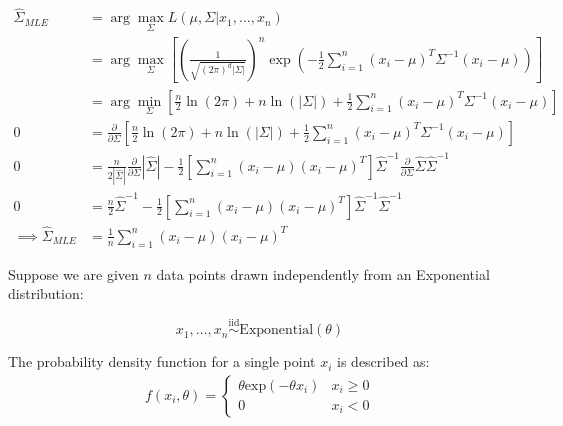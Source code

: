 \documentclass{article}
\newcommand{\iid}{\stackrel{\text{iid}}{\sim}}
\begin{document}
\begin{probset}
\begin{prob}
\begin{subprobset}
\begin{subprob}
        \begin{soln}
            \begin{align*}
                \hat{\Sigma}_{MLE} &= \arg\max_{\Sigma} L(\mu, \Sigma | x_1, \dots, x_n) \\
                &= \arg\max_{\Sigma} \left[ \left(\frac{1}{\sqrt{(2\pi)^d |\Sigma|}}\right)^n \exp\left(-\frac{1}{2} \sum_{i=1}^n (x_i - \mu)^T \Sigma^{-1} (x_i - \mu)\right) \right] \\
                &= \arg\min_{\Sigma} \left[ \frac{n}{2}\ln(2\pi) + n\ln(|\Sigma|) + \frac{1}{2} \sum_{i=1}^n (x_i - \mu)^T \Sigma^{-1} (x_i - \mu) \right] \\
                0 &= \frac{\partial}{\partial \Sigma} \left[ \frac{n}{2}\ln(2\pi) + n\ln(|\Sigma|) + \frac{1}{2} \sum_{i=1}^n (x_i - \mu)^T \Sigma^{-1} (x_i - \mu) \right] \\
                0 &= \frac{n}{2|\hat{\Sigma}|} \frac{\partial}{\partial\Sigma} |\hat{\Sigma}| - \frac{1}{2} \left[ \sum_{i=1}^n (x_i - \mu) (x_i - \mu)^T \right] \hat{\Sigma}^{-1} \frac{\partial}{\partial\Sigma} \hat{\Sigma} \hat{\Sigma}^{-1} \\
                0 &= \frac{n}{2}\hat{\Sigma}^{-1} - \frac{1}{2} \left[ \sum_{i=1}^n (x_i - \mu) (x_i - \mu)^T \right] \hat{\Sigma}^{-1} \hat{\Sigma}^{-1} \\
                \implies \hat\Sigma_{MLE} &= \frac{1}{n} \sum_{i=1}^n (x_i - \mu) (x_i - \mu)^T
            \end{align*}
        \end{soln}
    \end{subprob}
\end{subprobset}
\end{prob}

\newpage

\begin{prob}
Suppose we are given $n$ data points drawn independently from an Exponential distribution:

\[ x_1, \dots, x_n \iid \text{Exponential}(\theta) \]

The probability density function for a single point $x_i$ is described as:
\begin{align}
    f (x_i, \theta) =
    \begin{cases}
        \theta \text{exp}(-\theta x_i) & x_i \geq 0 \\
        0 & x_i < 0
    \end{cases}
\end{align}


\end{prob}
\end{probset}
\end{document}
